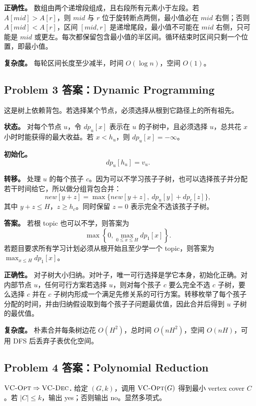 \documentclass[UTF8,a4paper,11pt]{ctexart}
\begin{document}
\textbf{正确性。} 数组由两个递增段组成，且右段所有元素小于左段。若 $A[mid]>A[r]$，则 $mid$ 与 $r$ 位于旋转断点两侧，最小值必在 $mid$ 右侧；否则 $A[mid]<A[r]$，区间 $[mid,r]$ 是递增尾段，最小值不可能在 $mid$ 右侧，只可能是 $mid$ 或更左。每次都保留包含最小值的半区间。循环结束时区间只剩一个位置，即最小值。

\textbf{复杂度。} 每轮区间长度至少减半，时间 $O(\log n)$，空间 $O(1)$。

\subsection*{Problem 3 答案：Dynamic Programming}

这是树上依赖背包。若选择某个节点，必须选择从根到它路径上的所有祖先。

\textbf{状态。} 对每个节点 $u$，令 $dp_u[x]$ 表示在 $u$ 的子树中，且必须选择 $u$，总共花 $x$ 小时时能获得的最大收益。若 $x<h_u$，则 $dp_u[x]=-\infty$。

\textbf{初始化。}
\[
dp_u[h_u]=v_u.
\]

\textbf{转移。} 处理 $u$ 的每个孩子 $c$。因为可以不学习孩子子树，也可以选择孩子并分配若干时间给它，所以做分组背包合并：
\[
new[y+z]=\max\{new[y+z],\ dp_u[y]+dp_c[z]\},
\]
其中 $y+z\le H$，$z\ge h_c$。同时保留 $z=0$ 表示完全不选该孩子子树。

\textbf{答案。} 若根 topic 也可以不学，则答案为
\[
\max\left\{0,\max_{0\le x\le H} dp_1[x]\right\}.
\]
若题目要求所有学习计划必须从根开始且至少学一个 topic，则答案为 $\max_{x\le H}dp_1[x]$。

\textbf{正确性。} 对子树大小归纳。对叶子，唯一可行选择是学它本身，初始化正确。对内部节点 $u$，任何可行方案若选择 $u$，则对每个孩子 $c$ 要么完全不选 $c$ 子树，要么选择 $c$ 并在 $c$ 子树内形成一个满足先修关系的可行方案。转移枚举了每个孩子分配的时间，并由归纳假设取到每个孩子子问题最优值，因此合并后得到 $u$ 子树的最优值。

\textbf{复杂度。} 朴素合并每条树边花 $O(H^2)$，总时间 $O(nH^2)$，空间 $O(nH)$，可用 DFS 后丢弃子表优化空间。

\subsection*{Problem 4 答案：Polynomial Reduction}

\textbf{$\textsc{VC-Opt}\Rightarrow\textsc{VC-Dec}$.} 给定 $(G,k)$，调用 $\textsc{VC-Opt}(G)$ 得到最小 vertex cover $C$。若 $|C|\le k$，输出 yes；否则输出 no。显然多项式。
\end{document}
